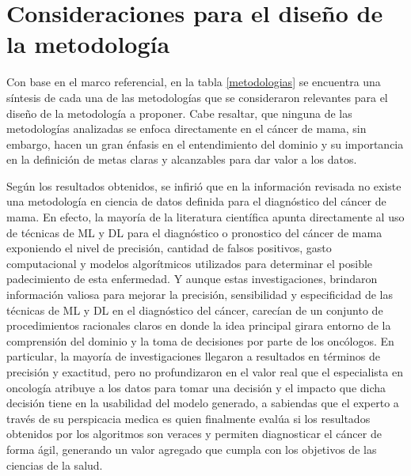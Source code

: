 \chapter{Consideraciones para el diseño de la metodología}
Con base en el marco referencial, en la tabla \ref{metodologias} se encuentra una síntesis de cada una de las metodologías que se consideraron relevantes para el diseño de la metodología a proponer. Cabe resaltar, que ninguna de las metodologías analizadas se enfoca directamente en el cáncer de mama, sin embargo, hacen un gran énfasis en el entendimiento del dominio y su importancia en la definición de metas claras y alcanzables para dar valor a los datos. 

Según los resultados obtenidos, se infirió que en la información revisada no existe una metodología en ciencia de datos definida para el diagnóstico del cáncer de mama.  En efecto, la mayoría de la literatura científica apunta directamente al uso de técnicas de ML y DL para el diagnóstico o pronostico del cáncer de mama exponiendo el nivel de precisión, cantidad de falsos positivos, gasto computacional y modelos algorítmicos utilizados para determinar el posible padecimiento de esta enfermedad. Y aunque estas investigaciones, brindaron información valiosa para mejorar la precisión, sensibilidad y especificidad de las técnicas de ML y DL en el diagnóstico del cáncer, carecían de un conjunto de procedimientos racionales claros en donde la idea principal girara entorno de la comprensión del dominio y la toma de decisiones por parte de los oncólogos. En particular, la mayoría de investigaciones llegaron a resultados en términos de precisión y exactitud, pero no profundizaron en el valor real que el especialista en oncología atribuye a los datos para tomar una decisión y el impacto que dicha decisión tiene en la usabilidad del modelo generado, a sabiendas que el experto a través de su perspicacia medica es quien finalmente evalúa si los resultados obtenidos por los algoritmos son veraces y permiten diagnosticar el cáncer de forma ágil, generando un valor agregado que cumpla con los objetivos de las ciencias de la salud. 

